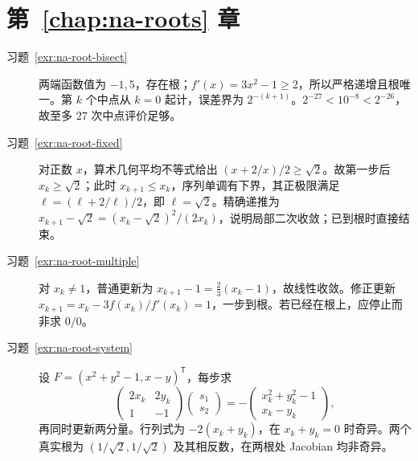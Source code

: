 \documentclass[UTF8,12pt,a4paper,fontset=fandol]{ctexbook}
\begin{document}
\section{第~\ref{chap:na-roots} 章}
\begin{description}
\item[习题~\ref{exr:na-root-bisect}] 两端函数值为 $-1,5$，存在根；$f'(x)=3x^2-1\ge2$，所以严格递增且根唯一。第 $k$ 个中点从 $k=0$ 起计，误差界为 $2^{-(k+1)}$。$2^{-27}<10^{-8}<2^{-26}$，故至多 $27$ 次中点评价足够。
\item[习题~\ref{exr:na-root-fixed}] 对正数 $x$，算术几何平均不等式给出 $(x+2/x)/2\ge\sqrt2$。故第一步后 $x_k\ge\sqrt2$；此时 $x_{k+1}\le x_k$，序列单调有下界，其正极限满足 $\ell=(\ell+2/\ell)/2$，即 $\ell=\sqrt2$。精确递推为 $x_{k+1}-\sqrt2=(x_k-\sqrt2)^2/(2x_k)$，说明局部二次收敛；已到根时直接结束。
\item[习题~\ref{exr:na-root-multiple}] 对 $x_k\ne1$，普通更新为 $x_{k+1}-1=\tfrac23(x_k-1)$，故线性收敛。修正更新 $x_{k+1}=x_k-3f(x_k)/f'(x_k)=1$，一步到根。若已经在根上，应停止而非求 $0/0$。
\item[习题~\ref{exr:na-root-system}] 设 $F=(x^2+y^2-1,x-y)^{\mathsf T}$，每步求
\[
 \begin{pmatrix}2x_k&2y_k\\1&-1\end{pmatrix}
 \begin{pmatrix}s_1\\s_2\end{pmatrix}
 =-\begin{pmatrix}x_k^2+y_k^2-1\\x_k-y_k\end{pmatrix},
\]
再同时更新两分量。行列式为 $-2(x_k+y_k)$，在 $x_k+y_k=0$ 时奇异。两个真实根为 $(1/\sqrt2,1/\sqrt2)$ 及其相反数，在两根处 Jacobian 均非奇异。
\end{description}
\end{document}
